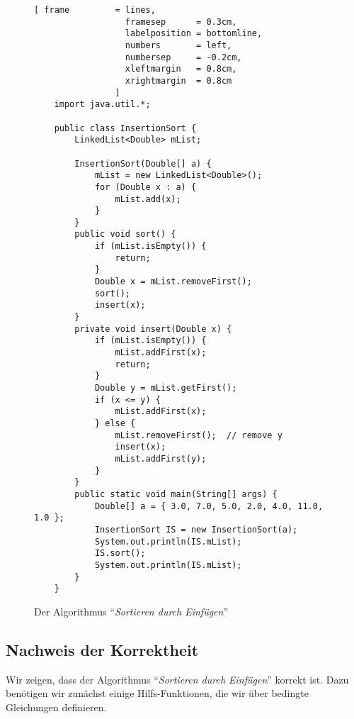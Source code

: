 \begin{figure}[!ht]
  \centering
\begin{Verbatim}[ frame         = lines, 
                  framesep      = 0.3cm, 
                  labelposition = bottomline,
                  numbers       = left,
                  numbersep     = -0.2cm,
                  xleftmargin   = 0.8cm,
                  xrightmargin  = 0.8cm
                ]
    import java.util.*;
    
    public class InsertionSort {
        LinkedList<Double> mList;
        
        InsertionSort(Double[] a) {
            mList = new LinkedList<Double>();
            for (Double x : a) {
                mList.add(x);
            }
        }    
        public void sort() {
            if (mList.isEmpty()) {
                return;
            }
            Double x = mList.removeFirst();
            sort();
            insert(x);
        }
        private void insert(Double x) {
            if (mList.isEmpty()) {
                mList.addFirst(x);
                return;
            }
            Double y = mList.getFirst();
            if (x <= y) {
                mList.addFirst(x);
            } else {
                mList.removeFirst();  // remove y
                insert(x);
                mList.addFirst(y);
            }
        }        
        public static void main(String[] args) {
            Double[] a = { 3.0, 7.0, 5.0, 2.0, 4.0, 11.0, 1.0 };
            InsertionSort IS = new InsertionSort(a);
            System.out.println(IS.mList);
            IS.sort();
            System.out.println(IS.mList);
        }
    }
\end{Verbatim}
\vspace*{-0.3cm}
  \caption{Der Algorithmus ``\emph{Sortieren durch Einf\"ugen}''}
  \label{fig:insertion-sort}
\end{figure} 

\subsection{Nachweis der Korrektheit}
Wir zeigen, dass der Algorithmus ``\emph{Sortieren durch Einf\"ugen}'' korrekt ist.
Dazu ben\"otigen wir zun\"achst einige Hilfs-Funktionen, die wir \"uber bedingte Gleichungen
definieren. 

